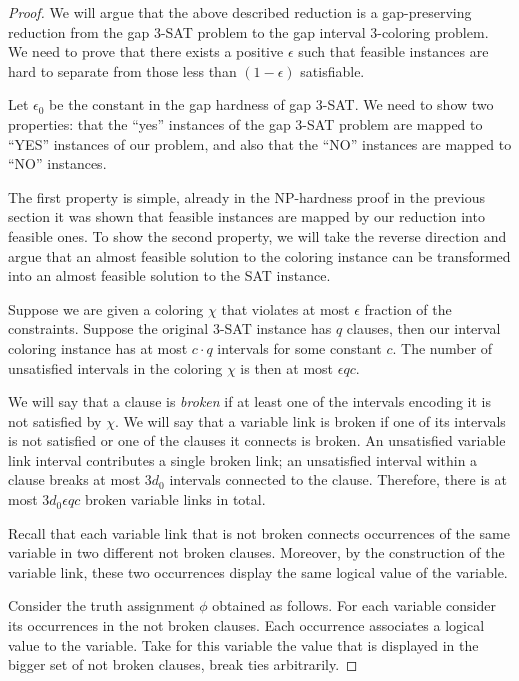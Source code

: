 \documentclass[a4paper,11pt]{article}
\theoremstyle{theorem}
\begin{document}
\begin{proof}
We will argue that the above described reduction is a gap-preserving reduction from
the gap 3-SAT problem to the gap interval 3-coloring problem. We need to prove that
there exists a positive $\epsilon$ such that feasible instances are hard to separate from
those less than $(1-\epsilon)$ satisfiable.

Let $\epsilon_0$ be the constant in the gap hardness of gap 3-SAT.
We need to show two properties: that the ``yes'' instances of the gap 3-SAT problem
are mapped to ``YES'' instances of our problem, and also that the ``NO''
instances are mapped to ``NO'' instances. 

The first property is simple, already in the NP-hardness proof in the previous section
it was shown that feasible instances are mapped by our reduction into feasible ones.  
To show the second property, we will take the reverse direction and argue that
an almost feasible solution to the coloring instance can be transformed into an almost feasible
solution to the SAT instance.

Suppose we are given a coloring $\chi$ that violates at most $\epsilon$ fraction of the constraints.
Suppose the original 3-SAT instance has $q$ clauses, then our interval coloring instance has at most $c \cdot q$
intervals for some constant $c$. The number of unsatisfied intervals in the coloring $\chi$ is then at most $\epsilon q c$.

We will say that a clause is \emph{broken} if at least one of the intervals encoding it is not satisfied by $\chi$. 
We will say that a variable link is broken if one of its intervals is not satisfied or one of the clauses it connects is broken. An unsatisfied variable link interval contributes a single broken link; an unsatisfied interval within a clause breaks at most $3 d_0$ intervals connected to the clause. Therefore, there is at most $3 d_0 \epsilon q c$ broken
variable links in total.

Recall that each variable link that is not broken connects
occurrences of the same variable in two different not broken clauses. 
Moreover, by the construction of the variable link, these two occurrences 
display the same logical value of the variable.

Consider the truth assignment $\phi$ obtained as follows. For each variable consider its occurrences
in the not broken clauses. Each occurrence associates a logical value to the variable.
Take for this variable the value that is displayed in the bigger set of not broken clauses,
break ties arbitrarily.


\end{proof}
\end{document}
